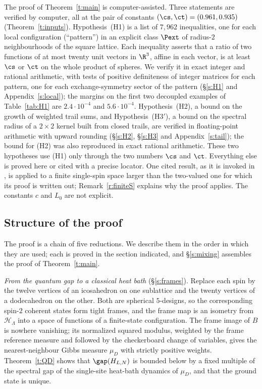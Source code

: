 The proof of Theorem~\ref{t:main} is computer-assisted. Three statements are verified by computer, all at the pair of constants $(\cs, \ct) = (0.961, 0.935)$ (Theorem~\ref{t:inputs}). Hypothesis~(H1) is a list of $7{,}962$ inequalities, one for each local configuration (``pattern'') in an explicit class $\Pext$ of radius-$2$ neighbourhoods of the square lattice. Each inequality asserts that a ratio of two functions of at most twenty unit vectors in $\R^3$, affine in each vector, is at least $\cs$ or $\ct$ on the whole product of spheres. We verify it in exact integer and rational arithmetic, with tests of positive definiteness of integer matrices for each pattern, one for each exchange-symmetry sector of the pattern (\S\ref{s:H1} and Appendix~\ref{s:local}); the margins on the first two decoupled examples of Table~\ref{tab:H1} are $2.4 \cdot 10^{-4}$ and $5.6 \cdot 10^{-4}$. Hypothesis~(H2), a bound on the growth of weighted trail sums, and Hypothesis~(H3$'$), a bound on the spectral radius of a $2 \times 2$ kernel built from closed trails, are verified in floating-point arithmetic with upward rounding (\S\ref{s:H2}, \S\ref{s:H3} and Appendix~\ref{s:tail}); the bound for (H2) was also reproduced in exact rational arithmetic. These two hypotheses use (H1) only through the two numbers $\cs$ and $\ct$. Everything else is proved here or cited with a precise locator. One cited result, \cite[Theorem~4.1]{MO94} as it is invoked in \cite{MOS94}, is applied to a finite single-spin space larger than the two-valued one for which its proof is written out; Remark~\ref{r:finiteS} explains why the proof applies. The constants $c$ and $L_0$ are not explicit.

\subsection{Structure of the proof}

The proof is a chain of five reductions. We describe them in the order in which they are used; each is proved in the section indicated, and \S\ref{s:mixing} assembles the proof of Theorem~\ref{t:main}.

\emph{From the quantum gap to a classical heat bath} (\S\ref{s:frames}). Replace each spin by the twelve vertices of an icosahedron on one sublattice and the twenty vertices of a dodecahedron on the other. Both are spherical $5$-designs, so the corresponding spin-$2$ coherent states form tight frames, and the frame map is an isometry from $\mathcal H_\Lambda$ into a space of functions of a finite-state configuration. The frame image of $B$ is nowhere vanishing; its normalized squared modulus, weighted by the frame reference measure and followed by the checkerboard change of variables, gives the nearest-neighbour Gibbs measure $\mu_D$ with strictly positive weights. Theorem~\ref{t:QD} shows that $\gap(H_{L, N})$ is bounded below by a fixed multiple of the spectral gap of the single-site heat-bath dynamics of $\mu_D$, and that the ground state is unique.

